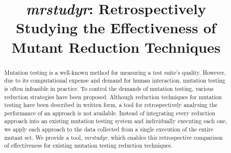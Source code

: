 \documentclass[conference]{IEEEtran}
\newcommand{\mr}{{\it mrstudyr}\xspace}
\begin{document}
\title{\mr: Retrospectively Studying the Effectiveness of Mutant Reduction Techniques}

\author{
\and
{}
\and
{}
}

\maketitle

\begin{abstract}
    Mutation testing is a well-known method for measuring a test suite's quality.
    However, due to its computational expense and demand for human interaction,
    mutation testing is often infeasible in practice. To control the demands of
    mutation testing, various reduction strategies have been proposed.
    Although reduction techniques for mutation testing have been described
    in written form, a tool for retrospectively analysing the performance of
    an approach is not available.
    Instead of integrating every reduction approach into an existing mutation testing system and
    individually executing each one, we apply each approach to the data
    collected from a single execution of the entire mutant set.
    We provide a tool, \mr, which enables this retrospective
    comparison of effectiveness for existing mutation testing reduction techniques.
\end{abstract}

\IEEEpeerreviewmaketitle









\end{document}
